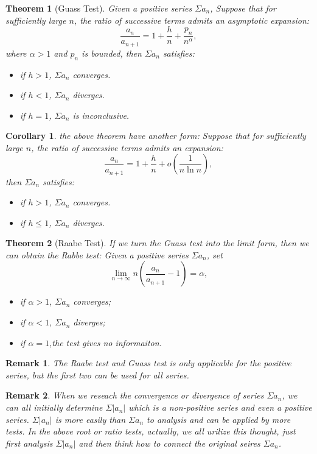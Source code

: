 \documentclass[12pt]{article}
\theoremstyle{oneline}
\newtheorem{theorem}{Theorem}[subsection]
\newtheorem{remark}{Remark}[subsection]
\newtheorem{corollary}{Corollary}[subsection]
\theoremstyle{twoline}
\begin{document}
\begin{theorem}[Guass Test]
  Given a positive series $\Sigma a_n$, Suppose that for sufficiently large $n$, the ratio of successive terms admits an asymptotic expansion:
  \[\frac{a_n}{a_{n+1}}=1+\frac hn+\frac{p_n}{n^\alpha},\]
  where $\alpha>1$ and $p_n$ is bounded, then $\Sigma a_n$ satisfies:
  \begin{itemize}
    \item if $h>1$, $\Sigma a_n$ converges.
    \item if $h<1$, $\Sigma a_n$ diverges.
    \item if $h=1$, $\Sigma a_n$ is inconclusive.
  \end{itemize}
\end{theorem}

\begin{corollary}
the above theorem have another form: Suppose that for sufficiently large $n$, the ratio of successive terms admits an expansion:
  \[\frac{a_n}{a_{n+1}}=1+\frac hn+o(\frac1{n\ln n}),\]
  then $\Sigma a_n$ satisfies:
  \begin{itemize}
    \item if $h>1$, $\Sigma a_n$ converges.
    \item if $h\leq1$, $\Sigma a_n$ diverges.
  \end{itemize}
\end{corollary}

\begin{theorem}[Raabe Test]
  If we turn the Guass test into the limit form, then we can obtain the Rabbe test: Given a positive series $\Sigma a_n$, set
  \[\lim\limits_{n\to\infty} n(\frac{a_n}{a_{n+1}}-1)=\alpha,\]
  \begin{itemize}
    \item if $\alpha>1$, $\Sigma a_n$ converges;
    \item if $\alpha<1$, $\Sigma a_n$ diverges;
    \item if $\alpha=1$,the test gives no informaiton.
  \end{itemize}
\end{theorem}

\begin{remark}
  The Raabe test and Guass test is only applicable for the positive series, but the first two can be used for all series.
\end{remark}

\begin{remark}
  When we reseach the convergence or divergence of series $\Sigma a_n$, we can all initially determine $\Sigma |a_n|$ which is a non-positive series and even a positive series. $\Sigma |a_n|$ is more easily than $\Sigma a_n$ to analysis and can be applied by more tests. In the above root or ratio tests, actually, we all urilize this thought, just first analysis $\Sigma |a_n|$ and then think how to connect the original seires $\Sigma a_n$. 
\end{remark}
\end{document}
